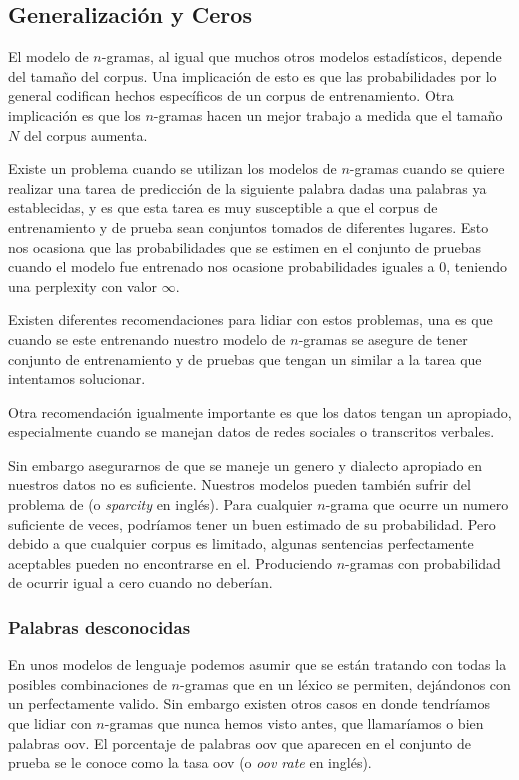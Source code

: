 \subsection{Generalización y Ceros}
El modelo de $n$-gramas, al igual que muchos otros modelos estadísticos, depende del tamaño del \gls{corpus}. Una implicación de esto es que las probabilidades por lo general codifican hechos específicos de un \gls{corpus} de entrenamiento. Otra implicación es que los $n$-gramas hacen un mejor trabajo a medida que el tamaño $N$ del \gls{corpus} aumenta.

Existe un problema cuando se utilizan los modelos de $n$-gramas cuando se quiere realizar una tarea de predicción de la siguiente palabra dadas una palabras ya establecidas, y es que esta tarea es muy susceptible a que el \gls{corpus} de entrenamiento y de prueba sean conjuntos tomados de diferentes lugares. Esto nos ocasiona que las probabilidades que se estimen en el conjunto de pruebas cuando el modelo fue entrenado nos ocasione probabilidades iguales a $0$, teniendo una \gls{perplexity} con valor $\infty$.

Existen diferentes recomendaciones para lidiar con estos problemas, una es que cuando se este entrenando nuestro modelo de $n$-gramas se asegure de tener conjunto de entrenamiento y de pruebas que tengan un  similar a la tarea que intentamos solucionar.

Otra recomendación igualmente importante es que los datos tengan un  apropiado, especialmente cuando se manejan datos de redes sociales o transcritos verbales.

Sin embargo asegurarnos de que se maneje un genero y dialecto apropiado en nuestros datos no es suficiente. Nuestros modelos pueden también sufrir del problema de  (o \textsl{sparcity} en inglés). Para cualquier $n$-grama que ocurre un numero suficiente de veces, podríamos tener un buen estimado de su probabilidad. Pero debido a que cualquier \gls{corpus} es limitado, algunas sentencias perfectamente aceptables pueden no encontrarse en el. Produciendo $n$-gramas con probabilidad de ocurrir igual a cero cuando no deberían.

\subsubsection{Palabras desconocidas}
En unos modelos de lenguaje podemos asumir que se están tratando con todas la posibles combinaciones de $n$-gramas que en un léxico se permiten, dejándonos con un  perfectamente valido. Sin embargo existen otros casos en donde tendríamos que lidiar con $n$-gramas que nunca hemos visto antes, que llamaríamos  o bien palabras \gls{oov}. El porcentaje de palabras \gls{oov} que aparecen en el conjunto de prueba se le conoce como la tasa \gls{oov} (o \textsl{\gls{oov} rate} en inglés).

